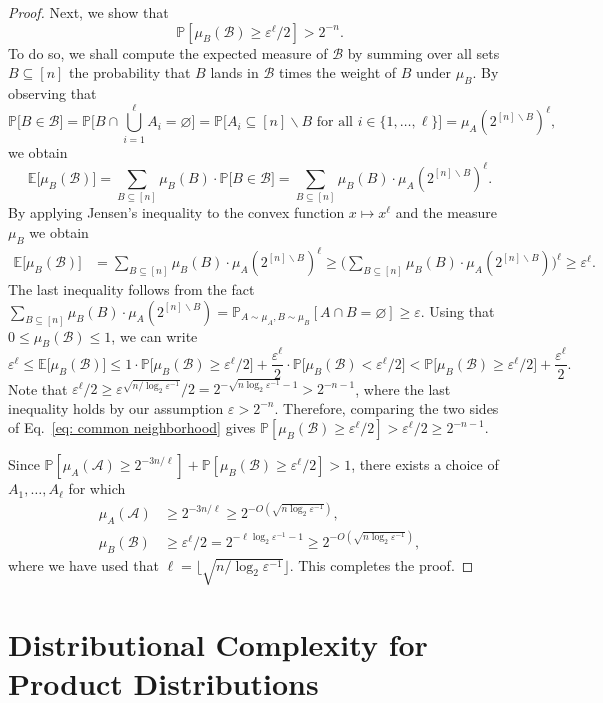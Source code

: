 \documentclass[11pt]{amsart}
\theoremstyle{definition}
\def\eps{\varepsilon}
\def\cA{\mathcal{A}}
\def\cB{\mathcal{B}}
\def\bE{\mathbb{E}}
\def\Pb{\mathbb{P}}
\begin{document}
\begin{proof}
Next, we show that \[\Pb[\mu_B(\cB)\geq \eps^\ell/2]> 2^{-n}.\]
To do so, we shall compute the expected measure of $\cB$ by summing over all sets $B\subseteq [n]$ the probability that $B$ lands in $\cB$ times the weight of $B$ under $\mu_B$. By observing that \[\Pb\big[B\in \cB\big]=\Pb\big[B\cap \bigcup_{i=1}^\ell A_i=\varnothing\big]=\Pb\big[A_i\subseteq [n]\backslash B\text{ for all }i\in \{1, \dots, \ell\}\big]=\mu_A(2^{[n]\backslash B})^\ell,\] we obtain
\[\bE\big[\mu_B(\cB)\big]=\sum_{B\subseteq [n]} \mu_B(B)\cdot \Pb\big[B\in \cB\big]=\sum_{B\subseteq [n]} \mu_B(B)\cdot \mu_A(2^{[n]\backslash B})^\ell.\]
By applying Jensen's inequality to the convex function $x\mapsto x^\ell$ and the measure $\mu_B$ we obtain
\begin{align*}
\bE\big[\mu_B(\cB)\big]&=\sum_{B\subseteq [n]} \mu_B(B)\cdot \mu_A(2^{[n]\backslash B})^\ell\geq \Big(\sum_{B\subseteq [n]} \mu_B(B)\cdot \mu_A(2^{[n]\backslash B})\Big)^\ell\geq \eps^\ell.
\end{align*}
The last inequality follows from the fact $\sum_{B\subseteq [n]} \mu_B(B)\cdot \mu_A(2^{[n]\backslash B})=\Pb_{A\sim \mu_A, B\sim \mu_B}[A\cap B=\varnothing]\geq \eps$. Using that $0\leq \mu_B(\cB)\leq 1$, we can write \begin{equation}\label{eq: common neighborhood}\eps^\ell \leq \bE\big[\mu_B(\cB)\big]\leq  1\cdot \Pb\Big[\mu_B(\cB)\geq \eps^\ell /2\Big] + \frac{\eps^\ell }{2}\cdot \Pb\Big[\mu_B(\cB)< \eps^\ell/2\Big] <  \Pb\Big[\mu_B(\cB)\geq \eps^\ell /2\Big]+\frac{\eps^\ell }{2}.\end{equation}
Note that $\eps^\ell/2\geq \eps^{\sqrt{n/\log_2\eps^{-1}}}/2 = 2^{-\sqrt{n\log_2\eps^{-1}}-1}> 2^{-n-1}$, where the last inequality holds by our assumption $\eps> 2^{-n}$. Therefore, comparing the two sides of Eq.~\ref{eq: common neighborhood} gives $\Pb[\mu_B(\cB)\geq \eps^\ell/2]>\eps^{\ell}/2\geq 2^{-n-1}$. 

Since $\Pb[\mu_A(\cA)\geq 2^{-3n/\ell}]+\Pb[\mu_B(\cB)\geq \eps^\ell/2]>1$, there exists a choice of $A_1,\dots,A_\ell$ for which 
\begin{align*}
\mu_A(\cA)&\geq 2^{-3n/\ell}\geq 2^{-O(\sqrt{n\log_2\eps^{-1}})},\\
\mu_B(\cB)&\geq \eps^\ell /2=2^{-\ell\log_2\eps^{-1}-1}\geq 2^{-O(\sqrt{n\log_2\eps^{-1}})},
\end{align*}
where we have used that $\ell=\lfloor \sqrt{n/\log_2\eps^{-1}}\rfloor$. This completes the proof.
\end{proof}

\section{Distributional Complexity for Product Distributions}\label{sec:reduction}
\end{document}
